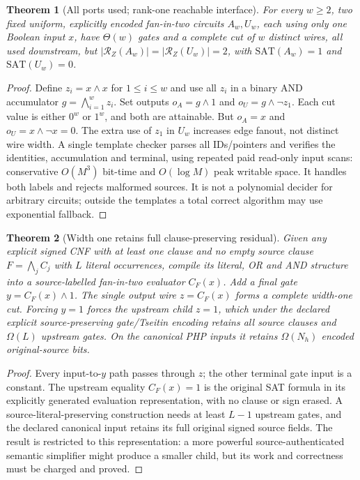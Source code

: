 \documentclass[11pt]{article}
\newtheorem{theorem}{Theorem}
\begin{document}
\begin{theorem}[All ports used; rank-one reachable interface]
For every $w\ge2$, two fixed uniform, explicitly encoded fan-in-two circuits $A_w,U_w$, each using only one Boolean input $x$, have $\Theta(w)$ gates and a complete cut of $w$ distinct wires, all used downstream, but $|\mathcal R_Z(A_w)|=|\mathcal R_Z(U_w)|=2$, with $\mathrm{SAT}(A_w)=1$ and $\mathrm{SAT}(U_w)=0$.
\end{theorem}
\begin{proof}
Define $z_i=x\wedge x$ for $1\le i\le w$ and use all $z_i$ in a binary AND accumulator $g=\bigwedge_{i=1}^w z_i$. Set outputs $o_A=g\wedge1$ and $o_U=g\wedge\neg z_1$. Each cut value is either $0^w$ or $1^w$, and both are attainable. But $o_A=x$ and $o_U=x\wedge\neg x=0$. The extra use of $z_1$ in $U_w$ increases edge fanout, not distinct wire width. A single template checker parses all IDs/pointers and verifies the identities, accumulation and terminal, using repeated paid read-only input scans: conservative $O(M^3)$ bit-time and $O(\log M)$ peak writable space. It handles both labels and rejects malformed sources. It is not a polynomial decider for arbitrary circuits; outside the templates a total correct algorithm may use exponential fallback.
\end{proof}

\begin{theorem}[Width one retains full clause-preserving residual]
Given any explicit signed CNF with at least one clause and no empty source clause $F=\bigwedge_j C_j$ with $L$ literal occurrences, compile its literal, OR and AND structure into a source-labelled fan-in-two evaluator $C_F(x)$. Add a final gate $y=C_F(x)\wedge1$. The single output wire $z=C_F(x)$ forms a complete width-one cut. Forcing $y=1$ forces the upstream child $z=1$, which under the declared explicit source-preserving gate/Tseitin encoding retains all source clauses and $\Omega(L)$ upstream gates. On the canonical PHP inputs it retains $\Omega(N_h)$ encoded original-source bits.
\end{theorem}
\begin{proof}
Every input-to-$y$ path passes through $z$; the other terminal gate input is a constant. The upstream equality $C_F(x)=1$ is the original SAT formula in its explicitly generated evaluation representation, with no clause or sign erased. A source-literal-preserving construction needs at least $L-1$ upstream gates, and the declared canonical input retains its full original signed source fields. The result is restricted to this representation: a more powerful source-authenticated semantic simplifier might produce a smaller child, but its work and correctness must be charged and proved.
\end{proof}
\end{document}
